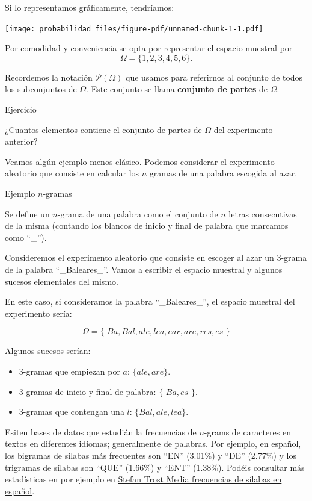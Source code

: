 \documentclass[
  letterpaper,
  DIV=11,
  numbers=noendperiod]{scrreprt}
\providecommand{\tightlist}{%
  \setlength{\itemsep}{0pt}\setlength{\parskip}{0pt}}\usepackage{longtable,booktabs,array}
\begin{document}
Si lo representamos gráficamente, tendríamos:

\begin{center}
\texttt{[image: probabilidad\_files/figure-pdf/unnamed-chunk-1-1.pdf]}
\end{center}

Por comodidad y conveniencia se opta por representar el espacio muestral
por \[\Omega = \{1,2,3,4,5,6\}.\]

Recordemos la notación \(\mathcal{P}(\Omega)\) que usamos para
referirnos al conjunto de todos los subconjuntos de \(\Omega\). Este
conjunto se llama \textbf{conjunto de partes} de \(\Omega\).

Ejercicio

¿Cuantos elementos contiene el conjunto de partes de \(\Omega\) del
experimento anterior?

Veamos algún ejemplo menos clásico. Podemos considerar el experimento
aleatorio que consiste en calcular los \(n\) gramas de una palabra
escogida al azar.

Ejemplo \(n\)-gramas

Se define un \(n\)-grama de una palabra como el conjunto de \(n\) letras
consecutivas de la misma (contando los blancos de inicio y final de
palabra que marcamos como ``\_'').

Consideremos el experimento aleatorio que consiste en escoger al azar un
3-grama de la palabra ``\_Baleares\_''. Vamos a escribir el espacio
muestral y algunos sucesos elementales del mismo.

En este caso, si consideramos la palabra ``\_Baleares\_'', el espacio
muestral del experimento sería:

\[\Omega=\{\_Ba, Bal, ale, lea, ear, are, res, es\_\}\]

Algunos sucesos serían:

\begin{itemize}
\tightlist
\item
  3-gramas que empiezan por \(a\): \(\{ale,are\}.\)
\item
  3-gramas de inicio y final de palabra: \(\{\_Ba,es\_\}.\)
\item
  3-gramas que contengan una \(l\): \(\{Bal,ale,lea\}.\)
\end{itemize}

Esiten bases de datos que estudián la frecuencias de \(n\)-grams de
caracteres en textos en diferentes idiomas; generalmente de palabras.
Por ejemplo, en español, los bigramas de sílabas más frecuentes son
``EN'' (3.01\%) y ``DE'' (2.77\%) y los trigramas de sílabas son ``QUE''
(1.66\%) y ``ENT'' (1.38\%). Podéis consultar más estadísticas en por
ejemplo en
\href{https://es.sttmedia.com/frecuencias-de-silabas-espanol}{Stefan
Trost Media frecuencias de sílabas en español}.
\end{document}
